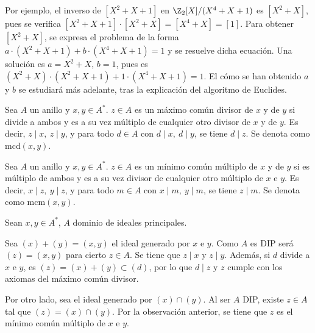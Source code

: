 \begin{obss}
    \item Por ejemplo, el inverso de $[X^2 + X + 1]$ en $\Z_2[X]/(X^4 + X + 1)$ es $[X^2 + X]$, pues se verifica $[X^2 + X + 1]\cdot [X^2 + X] = [X^4 + X] = [1]$. Para obtener $[X^2 + X]$, se expresa el problema de la forma $a\cdot(X^2 + X + 1) + b\cdot(X^4 + X + 1) = 1$ y se resuelve dicha ecuación. Una solución es $a = X^2 + X$, $b = 1$, pues es $(X^2 + X)\cdot(X^2 + X + 1) + 1\cdot(X^4 + X + 1) = 1$. El cómo se han obtenido $a$ y $b$ se estudiará más adelante, tras la explicación del algoritmo de Euclides.
\end{obss}

\medskip

\begin{deff}{\cite[p.~40]{GamboaAnillos}}
    \item Sea $A$ un anillo y $x,y\in A^*$. $z\in A$ es un máximo común divisor de $x$ y de $y$ si divide a ambos y es a su vez múltiplo de cualquier otro divisor de $x$ y de $y$. Es decir, $z\mid x,\ z\mid y$, y para todo $d\in A$ con $d\mid x, \ d\mid y$, se tiene $d\mid z$. Se denota como mcd$(x,y)$.
\end{deff}

\begin{deff}{\cite[p.~40]{GamboaAnillos}}
    \item Sea $A$ un anillo y $x,y\in A^*$. $z\in A$ es un mínimo común múltiplo de $x$ y de $y$ si es múltiplo de ambos y es a su vez divisor de cualquier otro múltiplo de $x$ e $y$. Es decir, $x\mid z,\ y\mid z$, y para todo $m\in A$ con $x\mid m, \ y\mid m$, se tiene $z\mid m$. Se denota como mcm$(x,y)$.
\end{deff}



\begin{prop}\end{prop}

\begin{dem}{\cite[p.~41]{GamboaAnillos}}
    Sean $x,y \in A^*$, $A$ dominio de ideales principales.
        \item Sea $ (x) + (y) =(x,y)$ el ideal generado por $x$ e $y$. Como $A$ es DIP será $(z) = (x,y)$ para cierto $z\in A$. Se tiene que $z\mid x$ y $z\mid y$. Además, si $d$ divide a $x$ e $y$, es $(z) = (x) + (y)  \subset (d)$, por lo que $d\mid z$ y $z$ cumple con los axiomas del máximo común divisor.

        \item Por otro lado, sea el ideal generado por $(x) \cap (y)$. Al ser $A$ DIP, existe $z\in A$ tal que $(z) = (x) \cap (y)$. Por la observación anterior, se tiene que $z$ es el mínimo común múltiplo de $x$ e $y$. 
\end{dem}

